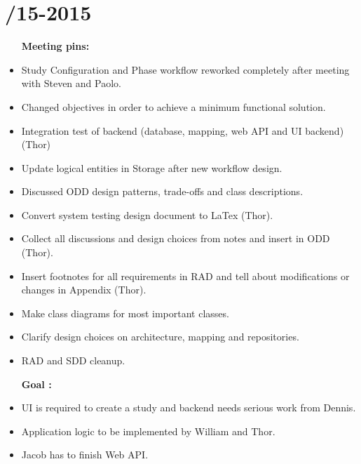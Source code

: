 \section{/15-2015} %
\attend{\at}{\at}{\at}{\at}


\begin{itemize}
	\item [\textbf{Meeting pins:}]
	\item Study Configuration and Phase workflow reworked completely after meeting with Steven and Paolo.
	\item Changed objectives in order to achieve a minimum functional solution. 
	\item Integration test of backend (database, mapping, web API and UI backend) (Thor)
	\item Update logical entities in Storage after new workflow design. 
	\item Discussed ODD design patterns, trade-offs and class descriptions. 
	\item Convert system testing design document to LaTex (Thor).
	\item Collect all discussions and design choices from notes and insert in ODD (Thor).
	\item Insert footnotes for all requirements in RAD and tell about modifications or changes in Appendix (Thor). 
	\item Make class diagrams for most important classes.
	\item Clarify design choices on architecture, mapping and repositories. 
	\item RAD and SDD cleanup. 
\end{itemize}

\begin{itemize}
	\item[\textbf{Goal : }]
	\item UI is required to create a study and backend needs serious work from Dennis.
	\item Application logic to be implemented by William and Thor. 
	\item Jacob has to finish Web API. 
\end{itemize}